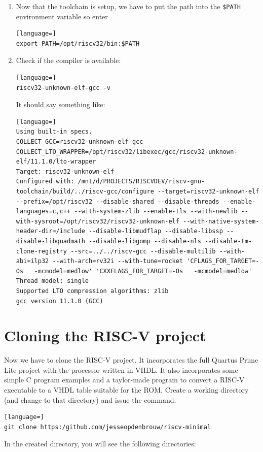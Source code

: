 \documentclass[12pt]{article}
\begin{document}
\begin{enumerate}
\item Now that the toolchain is setup, we have to put the path into the \lstinline|$PATH| environment variable so enter
\begin{lstlisting}[language=]
export PATH=/opt/riscv32/bin:$PATH
\end{lstlisting}
\item Check if the compiler is available:
\begin{lstlisting}[language=]
riscv32-unknown-elf-gcc -v
\end{lstlisting}
It should say something like:
\begin{lstlisting}[language=]
Using built-in specs.
COLLECT_GCC=riscv32-unknown-elf-gcc
COLLECT_LTO_WRAPPER=/opt/riscv32/libexec/gcc/riscv32-unknown-elf/11.1.0/lto-wrapper
Target: riscv32-unknown-elf
Configured with: /mnt/d/PROJECTS/RISCVDEV/riscv-gnu-toolchain/build/../riscv-gcc/configure --target=riscv32-unknown-elf --prefix=/opt/riscv32 --disable-shared --disable-threads --enable-languages=c,c++ --with-system-zlib --enable-tls --with-newlib --with-sysroot=/opt/riscv32/riscv32-unknown-elf --with-native-system-header-dir=/include --disable-libmudflap --disable-libssp --disable-libquadmath --disable-libgomp --disable-nls --disable-tm-clone-registry --src=../../riscv-gcc --disable-multilib --with-abi=ilp32 --with-arch=rv32i --with-tune=rocket 'CFLAGS_FOR_TARGET=-Os   -mcmodel=medlow' 'CXXFLAGS_FOR_TARGET=-Os   -mcmodel=medlow'
Thread model: single
Supported LTO compression algorithms: zlib
gcc version 11.1.0 (GCC) 
\end{lstlisting}
\end{enumerate}

\section{Cloning the RISC-V project}
\label{sec:cloning}
Now we have to clone the RISC-V project. It incorporates the full Quartus Prime Lite project with the processor written in VHDL. It also incorporates some simple C program examples and a taylor-made program to convert a RISC-V executable to a VHDL table suitable for the ROM. Create a working directory (and change to that directory) and issue the command:

\begin{lstlisting}[language=]
git clone https:/github.com/jesseopdenbrouw/riscv-minimal
\end{lstlisting}

In the created directory, you will see the following directories:
\end{document}
